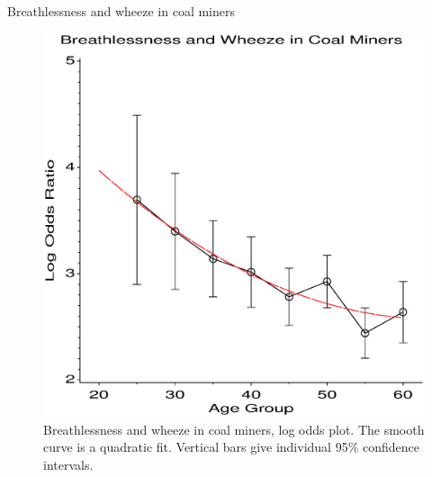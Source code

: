\begin{Example}[wheeze1]{Breathlessness and wheeze in coal miners}
\begin{figure}[htb]
  \centering
  \includegraphics[scale=.6]{ch3/fig/pie2x2wh2}
  \caption[Breathlessness and wheeze in coal miners, odds ratios]{Breathlessness and wheeze in coal miners, log odds plot.  The smooth curve is a quadratic fit.
  Vertical bars give individual 95\% confidence intervals.}\label{fig:pie2x2wh2}
\end{figure}


\end{Example}
